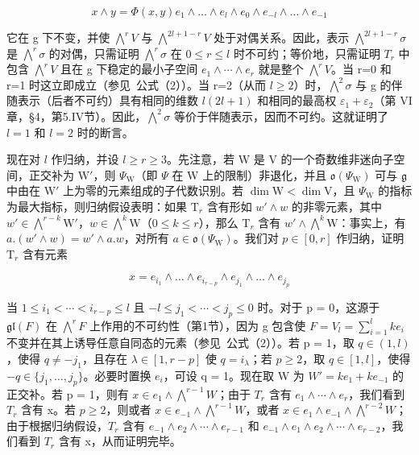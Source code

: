 \[
x \wedge y = \varPhi (x, y) e _ {1} \wedge \dots \wedge e _ {l} \wedge e _ {0} \wedge e _ {- l} \wedge \dots \wedge e _ {- 1}
\]

它在 g 下不变，并使 \(\bigwedge^{r}V\) 与 \(\bigwedge^{2l+1-r}V\) 处于对偶关系。因此，表示 \(\bigwedge^{2l+1-r}\sigma\) 是 \(\bigwedge^{r}\sigma\) 的对偶，只需证明 \(\bigwedge^{r}\sigma\) 在 \(0\leq r\leq l\) 时不可约；等价地，只需证明 \(T_{r}\) 中包含 \(\bigwedge^{r}V\) 且在 g 下稳定的最小子空间 \(e_{1}\wedge\cdots\wedge e_{r}\) 就是整个 \(\bigwedge^{r}V\)。当 r=0 和 r=1 时这立即成立（参见~公式（2））。当 r=2（从而 \(l\geq2\)）时，\(\bigwedge^{2}\sigma\) 与 g 的伴随表示（后者不可约）具有相同的维数 \(l(2l + 1)\) 和相同的最高权 \(\varepsilon_1 + \varepsilon_2\)（第 VI 章，§4，第5.IV节）。因此，\(\bigwedge^2\sigma\) 等价于伴随表示，因而不可约。这就证明了 \(l = 1\) 和 \(l = 2\) 时的断言。

现在对 \(l\) 作归纳，并设 \(l \geq r \geq 3\)。先注意，若 W 是 V 的一个奇数维非迷向子空间，正交补为 \(\mathrm{W}'\)，则 \(\Psi_{\mathrm{W}}\)（即 \(\Psi\) 在 W 上的限制）非退化，并且 \(\mathfrak{o}(\Psi_{\mathrm{W}})\) 可与 \(\mathfrak{g}\) 中由在 \(\mathrm{W}'\) 上为零的元素组成的子代数识别。若 \(\dim \mathrm{W} < \dim \mathrm{V}\)，且 \(\Psi_{\mathrm{W}}\) 的指标为最大指标，则归纳假设表明：如果 \(\mathrm{T}_r\) 含有形如 \(w' \wedge w\) 的非零元素，其中 \(w' \in \bigwedge^{r - k} \mathrm{W}'\)，\(w \in \bigwedge^k \mathrm{W}\)（\(0 \leq k \leq r\)），那么 \(\mathrm{T}_r\) 含有 \(w' \wedge \bigwedge^k \mathrm{W}\)：事实上，有 \(a.(w' \wedge w) = w' \wedge a.w\)，对所有 \(a \in \mathfrak{o}(\Psi_{\mathrm{W}})\)。我们对 \(p \in [0, r]\) 作归纳，证明 \(\mathrm{T}_r\) 含有元素

\[
x = e _ {i _ {1}} \wedge \dots \wedge e _ {i _ {r - p}} \wedge e _ {j _ {1}} \wedge \dots \wedge e _ {j _ {p}}
\]

当 \(1 \leq i_{1} < \cdots < i_{r-p} \leq l\) 且 \(-l \leq j_{1} < \cdots < j_{p} \leq 0\) 时。对于 p = 0，这源于 \(\mathfrak{gl}(F)\) 在 \(\bigwedge^{r} F\) 上作用的不可约性（第1节），因为 g 包含使 \(F = V_{l} = \sum_{i=1}^{l} ke_{i}\) 不变并在其上诱导任意自同态的元素（参见~公式（2））。若 p = 1，取 \(q \in (1, l)\)，使得 \(q \neq -j_{1}\)，且存在 \(\lambda \in [1, r - p]\) 使 \(q = i_{\lambda}\)；若 \(p \geq 2\)，取 \(q \in [1, l]\)，使得 \(-q \in \{j_{1}, \ldots, j_{p}\}\)。必要时置换 \(e_{i}\)，可设 q = 1。现在取 W 为 \(W' = ke_{1} + ke_{-1}\) 的正交补。若 p = 1，则有 \(x \in e_{1} \wedge \bigwedge^{r-1} W\)；由于 \(T_{r}\) 含有 \(e_{1} \wedge \cdots \wedge e_{r}\)，我们看到 \(T_{r}\) 含有 x。若 \(p \geq 2\)，则或者 \(x \in e_{-1} \wedge \bigwedge^{r-1} W\)，或者 \(x \in e_{1} \wedge e_{-1} \wedge \bigwedge^{r-2} W\)；由于根据归纳假设，\(T_{r}\) 含有 \(e_{-1} \wedge e_{2} \wedge \cdots \wedge e_{r-1}\) 和 \(e_{-1} \wedge e_{1} \wedge e_{2} \wedge \cdots \wedge e_{r-2}\)，我们看到 \(T_{r}\) 含有 x，从而证明完毕。

